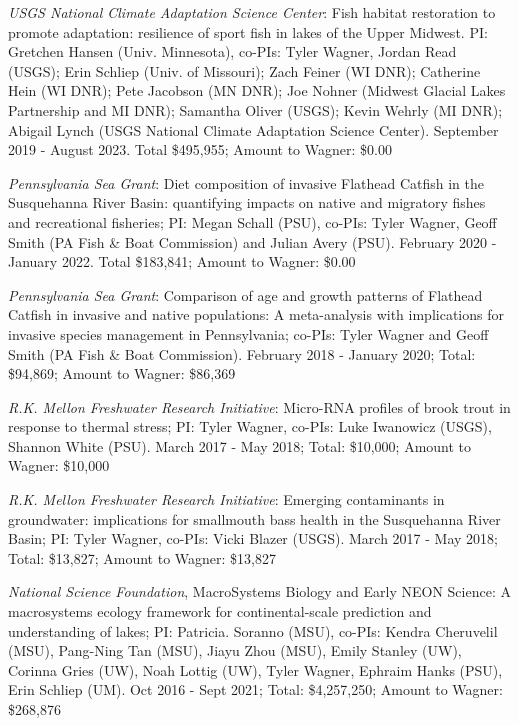 \documentclass[10pt]{article}
\begin{document}
\begin{flushleft}
\begin{etaremune}
\item  {\sl USGS National Climate Adaptation Science Center}: Fish habitat restoration to promote adaptation: resilience of sport fish in lakes of the Upper Midwest. PI: Gretchen Hansen (Univ. Minnesota), co-PIs: Tyler Wagner, Jordan Read (USGS); Erin Schliep (Univ. of Missouri); Zach Feiner (WI DNR); Catherine Hein (WI DNR); Pete Jacobson (MN DNR); Joe Nohner (Midwest Glacial Lakes Partnership and MI DNR); Samantha Oliver (USGS); Kevin Wehrly (MI DNR); Abigail Lynch (USGS National Climate Adaptation Science Center). September 2019 - August 2023. Total \$495,955; Amount to Wagner: \$0.00

\item  {\sl Pennsylvania Sea Grant}: Diet composition of invasive Flathead Catfish in the Susquehanna River Basin: quantifying impacts on native and migratory fishes and recreational fisheries; PI: Megan Schall (PSU), co-PIs: Tyler Wagner, Geoff Smith (PA Fish \& Boat Commission) and Julian Avery (PSU). February 2020 - January 2022. Total \$183,841; Amount to Wagner: \$0.00

\item {\sl Pennsylvania Sea Grant}: Comparison of age and growth patterns of Flathead Catfish in invasive and native populations: A meta-analysis with implications for invasive species management in Pennsylvania; co-PIs: Tyler Wagner and Geoff Smith (PA Fish \& Boat Commission). February 2018 - January 2020; Total: \$94,869;  Amount to Wagner: \$86,369

\item {\sl  R.K. Mellon Freshwater Research Initiative}: Micro-RNA profiles of brook trout in response to thermal stress; PI: Tyler Wagner, co-PIs: Luke Iwanowicz (USGS), Shannon White (PSU). March 2017 - May 2018; Total: \$10,000; Amount to Wagner: \$10,000

\item {\sl  R.K. Mellon Freshwater Research Initiative}: Emerging contaminants in groundwater: implications for smallmouth bass health in the Susquehanna River Basin; PI: Tyler Wagner, co-PIs: Vicki Blazer (USGS). March 2017 - May 2018; Total: \$13,827; Amount to Wagner: \$13,827

\item {\sl National Science Foundation}, MacroSystems Biology and Early NEON Science: A macrosystems ecology framework for continental-scale prediction and understanding of lakes; PI: Patricia. Soranno (MSU), co-PIs: Kendra Cheruvelil (MSU), Pang-Ning Tan (MSU), Jiayu Zhou (MSU), Emily Stanley (UW), Corinna Gries (UW), Noah Lottig (UW), Tyler Wagner, Ephraim Hanks (PSU), Erin Schliep (UM). Oct 2016 - Sept 2021; Total: \$4,257,250; Amount to Wagner: \$268,876


\end{etaremune}
\end{flushleft}
\end{document}
